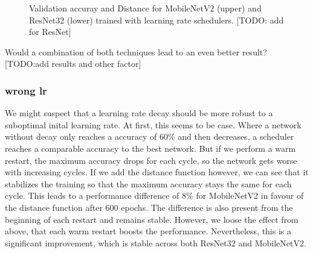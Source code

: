 \begin{figure}[h]\label{fig:Cosine_Multiple}
    \begin{center}
        \caption{Validation accuray and Distance for MobileNetV2 (upper) and ResNet32 (lower) trained with learning rate schedulers. [TODO: add for ResNet]}
    \end{center}
\end{figure}

Would a combination of both techniques lead to an even better result?
[TODO:add results and other factor] 


\subsubsection{wrong lr}

We might suspect that a learning rate decay should be more robust to a
suboptimal inital learning rate. At first, this seems to be case. Where a
network without decay only reaches a accuracy of 60\% and then decreases, a
scheduler reaches a comparable accuracy to the best network. But if we perform a
warm restart, the maximum accuracy drops for each cycle, so the network gets
worse with increasing cycles. If we add the distance function however, we can
see that it stabilizes the training so that the maximum accuracy stays the same
for each cycle. This leads to a performance difference of 8\% for MobileNetV2 in
favour of the distance function after 600 epochs. The difference is also present
from the beginning of each restart and remains stable. However, we loose the
effect from above, that each warm restart boosts the performance. Nevertheless,
this is a significant improvement, which is stable across both ResNet32 and
MobileNetV2.

